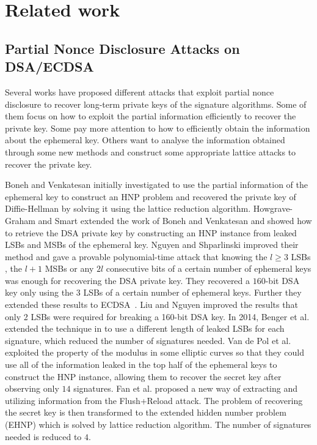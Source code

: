 \section{Related work}
\label{sec:relatedwork}
\subsection{Partial Nonce Disclosure Attacks on DSA/ECDSA}
Several works have proposed different attacks that exploit partial nonce disclosure to recover long-term private keys of the signature algorithms.
Some of them focus on how to exploit the partial information efficiently to recover the private key.
 Some pay more attention to how to efficiently obtain the information about the ephemeral key.
Others want to  analyse the information obtained through some new methods and construct some appropriate lattice attacks to recover the private key.

Boneh and Venkatesan \cite{boneh1996} initially investigated to use the partial information of the ephemeral key to construct an HNP problem and recovered the private key of Diffie-Hellman by solving it using the lattice reduction algorithm.
Howgrave-Graham and Smart \cite{HG2001} extended the work of Boneh and Venkatesan \cite{boneh1996} and  showed how to retrieve the DSA private key by  constructing an HNP instance from leaked LSBs and MSBs of the ephemeral key.
Nguyen and Shparlinski \cite{Nguyen2002} improved their method  and gave a provable polynomial-time attack that
      knowing the $l \geq 3$ LSBs , the $l+1$ MSBs  or any $2l$ consecutive bits of a certain number of ephemeral keys was enough for recovering the DSA private key.
 They recovered  a $160$-bit DSA key only using the $3$ LSBs of a certain number of ephemeral keys.
 Further they extended these results to ECDSA~\cite{Nguyen2003}.
Liu and Nguyen \cite{Liu2013} improved the results that only 2 LSBs were required for breaking a 160-bit DSA key.
In 2014, Benger et al. \cite{Benger2014} extended the technique in \cite{Nguyen2002} to use a different length of leaked LSBs for each signature,
 which reduced the number of signatures needed.
Van de Pol et al. \cite{Van2015} exploited the property of the modulus in some elliptic curves so that they could use all of the information leaked in the top half of the ephemeral keys to construct the HNP instance, allowing them to recover the secret key after observing only $14$ signatures.
Fan et al. \cite{Fan2016} proposed a new way of extracting and utilizing information from the Flush+Reload attack. The problem of recovering the
secret key is then transformed to the extended hidden number problem (EHNP) which is solved by lattice reduction algorithm. The number of signatures needed is reduced to $4$.

